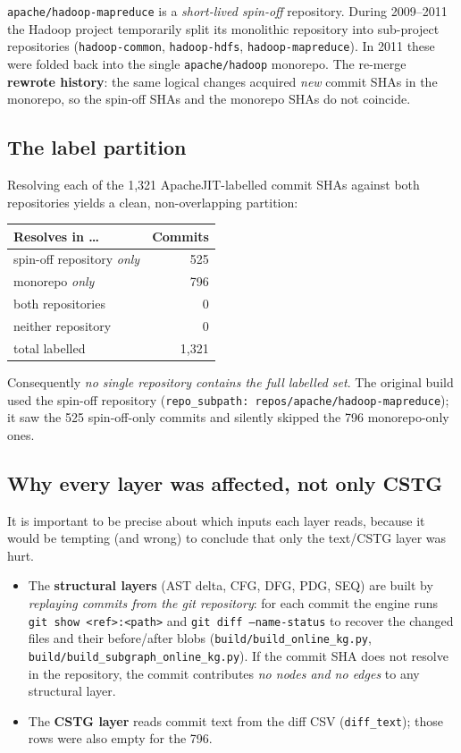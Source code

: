 \documentclass[11pt]{article}
\newcommand{\code}[1]{\texttt{#1}}
\begin{document}
\code{apache/hadoop-mapreduce} is a \emph{short-lived spin-off} repository. During
2009--2011 the Hadoop project temporarily split its monolithic repository into
sub-project repositories (\code{hadoop-common}, \code{hadoop-hdfs},
\code{hadoop-mapreduce}). In 2011 these were folded back into the single
\code{apache/hadoop} monorepo. The re-merge \textbf{rewrote history}: the same
logical changes acquired \emph{new} commit SHAs in the monorepo, so the spin-off
SHAs and the monorepo SHAs do not coincide.

\subsection{The label partition}
Resolving each of the 1{,}321 ApacheJIT-labelled commit SHAs against both
repositories yields a clean, non-overlapping partition:

\begin{center}
\begin{tabular}{@{}lr@{}}
\toprule
Resolves in \ldots{} & Commits \\
\midrule
spin-off repository \emph{only} & 525 \\
monorepo \emph{only}            & 796 \\
both repositories               & 0 \\
neither repository              & 0 \\
\midrule
total labelled                  & 1{,}321 \\
\bottomrule
\end{tabular}
\end{center}

Consequently \emph{no single repository contains the full labelled set}. The
original build used the spin-off repository (\code{repo\_subpath:
repos/apache/hadoop-mapreduce}); it saw the 525 spin-off-only commits and
silently skipped the 796 monorepo-only ones.

\subsection{Why every layer was affected, not only CSTG}
It is important to be precise about which inputs each layer reads, because it
would be tempting (and wrong) to conclude that only the text/CSTG layer was hurt.

\begin{itemize}
  \item The \textbf{structural layers} (AST delta, CFG, DFG, PDG, SEQ) are built
  by \emph{replaying commits from the git repository}: for each commit the engine
  runs \code{git show <ref>:<path>} and \code{git diff --name-status} to recover
  the changed files and their before/after blobs
  (\code{build/build\_online\_kg.py}, \code{build/build\_subgraph\_online\_kg.py}).
  If the commit SHA does not resolve in the repository, the commit contributes
  \emph{no nodes and no edges} to any structural layer.

  \item The \textbf{CSTG layer} reads commit text from the diff CSV
  (\code{diff\_text}); those rows were also empty for the 796.
\end{itemize}
\end{document}
